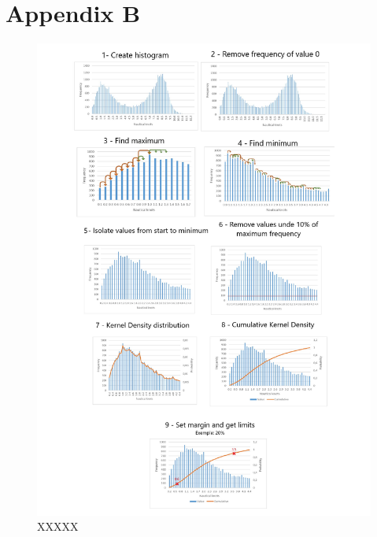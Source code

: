 \chapter{Appendix B} 
\label{appendix:anexo2}


\begin{figure}[H]
    \centering
    \includegraphics[trim=0 0 0 0,height=0.9\linewidth]{Chapters/img/hc.pdf}
    \caption{XXXXX}
    \label{fig:hist_comulative}
\end{figure}

